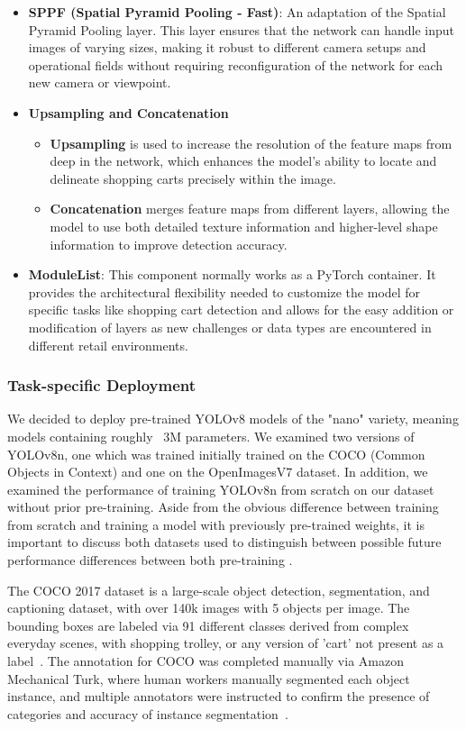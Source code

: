 \documentclass[10pt,twocolumn,letterpaper]{article}
\begin{document}
\begin{itemize}
    \item \textbf{SPPF (Spatial Pyramid Pooling - Fast)}: An adaptation of the Spatial Pyramid Pooling layer. This layer ensures that the network can handle input images of varying sizes, making it robust to different camera setups and operational fields without requiring reconfiguration of the network for each new camera or viewpoint.

    \item \textbf{Upsampling and Concatenation}
    \begin{itemize}
        \item \textbf{Upsampling} is used to increase the resolution of the feature maps from deep in the network, which enhances the model's ability to locate and delineate shopping carts precisely within the image.
        \item \textbf{Concatenation} merges feature maps from different layers, allowing the model to use both detailed texture information and higher-level shape information to improve detection accuracy.
    \end{itemize}

    \item \textbf{ModuleList}: This component normally works as a PyTorch container. It provides the architectural flexibility needed to customize the model for specific tasks like shopping cart detection and allows for the easy addition or modification of layers as new challenges or data types are encountered in different retail environments.

\end{itemize}

\subsubsection{Task-specific Deployment} 
We decided to deploy pre-trained YOLOv8 models of the "nano" variety, meaning models containing roughly ~3M parameters. We examined two versions of YOLOv8n, one which was trained initially trained on the COCO (Common Objects in Context) and one on the OpenImagesV7 dataset. In addition, we examined the performance of training YOLOv8n from scratch on our dataset without prior pre-training. Aside from the obvious difference between training from scratch and training a model with previously pre-trained weights, it is important to discuss both datasets used to distinguish between possible future performance differences between both pre-training .

The COCO 2017 dataset is a large-scale object detection, segmentation, and captioning dataset, with over 140k images with 5 objects per image. The bounding boxes are labeled via 91 different classes derived from complex everyday scenes, with shopping trolley, or any version of 'cart' not present as a label~\cite{coco}. The annotation for COCO was completed manually via Amazon Mechanical Turk, where human workers manually segmented each object instance, and multiple annotators were instructed to confirm the presence of categories and accuracy of instance segmentation~\cite{microsoft_coco}.
    
\end{document}
